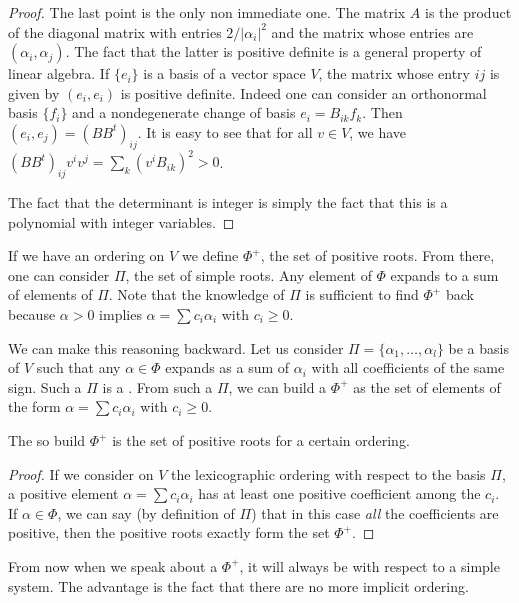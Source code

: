 \begin{proof}
	The last point is the only non immediate one. The matrix $A$ is the product of the diagonal matrix with entries $2/|\alpha_i|^2$ and the matrix whose entries are $(\alpha_i,\alpha_j)$. The fact that the latter is positive definite is a general property of linear algebra. If $\{e_i\}$ is a basis of a vector space $V$, the matrix whose entry $ij$ is given by $(e_i,e_i)$ is positive definite. Indeed one can consider an orthonormal basis $\{f_i\}$ and a nondegenerate change of basis $e_i=B_{ik}f_k$. Then $(e_i,e_j)=(BB^t)_{ij}$. It is easy to see that for all $v\in V$, we have $(BB^t)_{ij}v^iv^j=\sum_k(v^iB_{ik})^2>0$.

	The fact that the determinant is integer is simply the fact that this is a polynomial with integer variables.
\end{proof}

If we have an ordering on $V$ we define $\Phi^+$, the set of positive roots. From there, one can consider $\Pi$, the set of simple roots. Any element of $\Phi$ expands to a sum of elements of $\Pi$. Note that the knowledge of $\Pi$ is sufficient to find $\Phi^+$ back because $\alpha>0$ implies $\alpha=\sum c_i\alpha_i$ with $c_i\geq 0$.

We can make this reasoning backward. Let us consider $\Pi=\{\alpha_1,\ldots,\alpha_l\}$ be a basis of $V$ such that any $\alpha\in\Phi$ expands as a sum of $\alpha_i$ with all coefficients of the same sign. Such a $\Pi$ is a . From such a $\Pi$, we can build a $\Phi^+$ as the set of elements of the form $\alpha=\sum c_i\alpha_i$ with $c_i\geq 0$.

\begin{proposition}
	The so build $\Phi^+$ is the set of positive roots for a certain ordering.
\end{proposition}

\begin{proof}
	If we consider on $V$ the lexicographic ordering with respect to the basis $\Pi$, a positive element $\alpha=\sum c_i\alpha_i$ has at least one positive coefficient among the $c_i$. If $\alpha\in\Phi$, we can say (by definition of $\Pi$) that in this case \emph{all} the coefficients are positive, then the positive roots exactly form the set $\Phi^+$.
\end{proof}

From now when we speak about a $\Phi^+$, it will always be with respect to a simple system. The advantage is the fact that there are no more implicit ordering.

